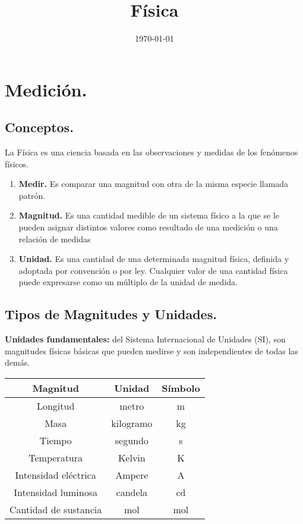 \documentclass[14pt]{extarticle}
\title{\vspace*{-2cm}Física\vspace{-5ex}}
\date{\today}
\begin{document}
\maketitle

\section{Medición.}

\subsection{Conceptos.}

La Física es una ciencia basada en las observaciones y medidas de los fenómenos físicos.

\begin{enumerate}[label=\alph*)]
\item \textbf{Medir.} Es comparar una magnitud con otra de la misma especie llamada patrón.
\item \textbf{Magnitud.} Es una cantidad medible de un sistema físico a la que se le pueden asignar distintos valores como resultado de una medición o una relación de medidas
\item \textbf{Unidad.}  Es una cantidad de una determinada magnitud física, definida y adoptada por convención o por ley. Cualquier valor de una cantidad física puede expresarse como un múltiplo de la unidad de medida.
\end{enumerate}

\subsection{Tipos de Magnitudes y Unidades.}

\textbf{Unidades fundamentales: } del Sistema Internacional de Unidades (SI), son magnitudes físicas básicas que pueden medirse y son independientes de todas las demás.
\begin{table}[H]
\centering
\begin{tabular}{| c | c | c |} \hline
Magnitud & Unidad & Símbolo \\ \hline
Longitud & metro & m \\ \hline
Masa & kilogramo & kg \\ \hline
Tiempo & segundo & s \\ \hline
Temperatura & Kelvin & K \\ \hline
Intensidad eléctrica & Ampere & A \\ \hline
Intensidad luminosa & candela & cd \\ \hline
Cantidad de sustancia & mol & mol \\  \hline  
\end{tabular}
\end{table}
\end{document}

